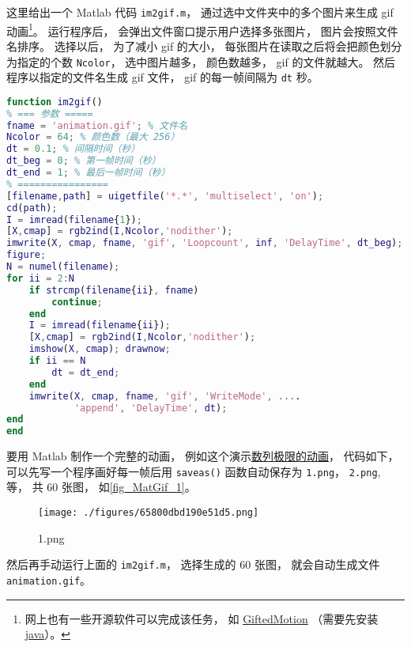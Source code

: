 

这里给出一个 Matlab 代码 \verb|im2gif.m|， 通过选中文件夹中的多个图片来生成 gif 动画\footnote{网上也有一些开源软件可以完成该任务， 如 \href{http://www.onyxbits.de/giftedmotion}{GiftedMotion} （需要先安装 \href{https://www.java.com/download/ie_manual.jsp}{java}）。}。 运行程序后， 会弹出文件窗口提示用户选择多张图片， 图片会按照文件名排序。 选择以后， 为了减小 gif 的大小， 每张图片在读取之后将会把颜色划分为指定的个数 \verb|Ncolor|， 选中图片越多， 颜色数越多， gif 的文件就越大。 然后程序以指定的文件名生成 gif 文件， gif 的每一帧间隔为 \verb|dt| 秒。

\begin{lstlisting}[language=matlab, caption=im2gif.m]
function im2gif()
% === 参数 =====
fname = 'animation.gif'; % 文件名
Ncolor = 64; % 颜色数（最大 256）
dt = 0.1; % 间隔时间（秒）
dt_beg = 0; % 第一帧时间（秒）
dt_end = 1; % 最后一帧时间（秒）
% ================
[filename,path] = uigetfile('*.*', 'multiselect', 'on');
cd(path);
I = imread(filename{1});
[X,cmap] = rgb2ind(I,Ncolor,'nodither');
imwrite(X, cmap, fname, 'gif', 'Loopcount', inf, 'DelayTime', dt_beg);
figure;
N = numel(filename);
for ii = 2:N
    if strcmp(filename{ii}, fname)
        continue;
    end
    I = imread(filename{ii});
    [X,cmap] = rgb2ind(I,Ncolor,'nodither');
    imshow(X, cmap); drawnow;
    if ii == N
        dt = dt_end;
    end
    imwrite(X, cmap, fname, 'gif', 'WriteMode', ....
            'append', 'DelayTime', dt);
end
end
\end{lstlisting}

要用 Matlab 制作一个完整的动画， 例如这个演示\href{https://wuli.wiki/apps/Lim0.html}{数列极限的动画}， 代码如下， 可以先写一个程序画好每一帧后用 \verb|saveas()| 函数自动保存为 \verb|1.png|， \verb|2.png|, 等， 共 60 张图， 如\autoref{fig_MatGif_1}。
\begin{figure}[ht]
\centering
\texttt{[image: ./figures/65800dbd190e51d5.png]}
\caption{1.png} \label{fig_MatGif_1}
\end{figure}
然后再手动运行上面的 \verb|im2gif.m|， 选择生成的 60 张图， 就会自动生成文件 \verb|animation.gif|。


